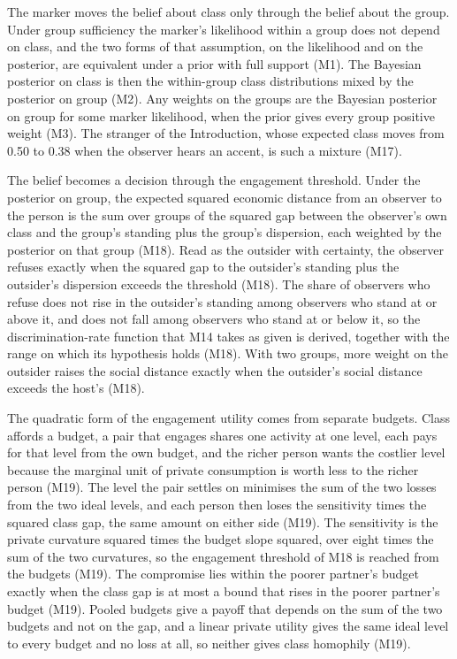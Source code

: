 The marker moves the belief about class only through the belief about the
group. Under group sufficiency the marker's likelihood within a group does
not depend on class, and the two forms of that assumption, on the likelihood
and on the posterior, are equivalent under a prior with full support (M1).
The Bayesian posterior on class is then the within-group class distributions
mixed by the posterior on group (M2). Any weights on the groups are the
Bayesian posterior on group for some marker likelihood, when the prior gives
every group positive weight (M3).
The stranger of the Introduction, whose expected class moves from 0.50 to
0.38 when the observer hears an accent, is such a mixture (M17).

The belief becomes a decision through the engagement threshold. Under the
posterior on group, the expected squared economic distance from an observer to
the person is the sum over groups of the squared gap between the observer's
own class and the group's standing plus the group's dispersion, each weighted by
the posterior on that group (M18). Read as the outsider with certainty, the
observer refuses exactly when the squared gap to the outsider's standing plus
the outsider's dispersion exceeds the threshold (M18). The share of observers who
refuse does not rise in the outsider's standing among observers who stand at
or above it, and does not fall among observers who stand at or below it, so
the discrimination-rate function that M14 takes as given is derived, together
with the range on which its hypothesis holds (M18). With two groups, more
weight on the outsider raises the social distance exactly when the
outsider's social distance exceeds the host's (M18).

The quadratic form of the engagement utility comes from separate budgets.
Class affords a budget, a pair that engages shares one activity at one
level, each pays for that level from the own budget, and the richer person
wants the costlier level because the marginal unit of private consumption is
worth less to the richer person (M19). The level the pair settles on
minimises the sum of the two losses from the two ideal levels, and each
person then loses the sensitivity times the squared class gap, the same
amount on either side (M19). The sensitivity is the private curvature
squared times the budget slope squared, over eight times the sum of the two
curvatures, so the engagement threshold of M18 is reached from the budgets
(M19). The compromise lies within the poorer partner's budget exactly when
the class gap is at most a bound that rises in the poorer partner's budget
(M19). Pooled budgets give a payoff that depends on the sum of the two
budgets and not on the gap, and a linear private utility gives the same ideal
level to every budget and no loss at all, so neither gives class homophily
(M19).

